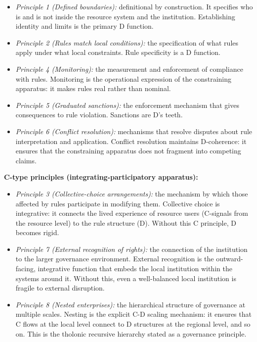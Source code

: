 \documentclass[12pt]{article}
\providecommand{\tightlist}{%
  \setlength{\itemsep}{0pt}\setlength{\parskip}{0pt}}
\begin{document}
\begin{itemize}
\tightlist
\item
  \emph{Principle 1 (Defined boundaries):} definitional by construction.
  It specifies who is and is not inside the resource system and the
  institution. Establishing identity and limits is the primary D
  function.
\item
  \emph{Principle 2 (Rules match local conditions):} the specification
  of what rules apply under what local constraints. Rule specificity is
  a D function.
\item
  \emph{Principle 4 (Monitoring):} the measurement and enforcement of
  compliance with rules. Monitoring is the operational expression of the
  constraining apparatus: it makes rules real rather than nominal.
\item
  \emph{Principle 5 (Graduated sanctions):} the enforcement mechanism
  that gives consequences to rule violation. Sanctions are D's teeth.
\item
  \emph{Principle 6 (Conflict resolution):} mechanisms that resolve
  disputes about rule interpretation and application. Conflict
  resolution maintains D-coherence: it ensures that the constraining
  apparatus does not fragment into competing claims.
\end{itemize}

\textbf{C-type principles (integrating-participatory apparatus):}

\begin{itemize}
\tightlist
\item
  \emph{Principle 3 (Collective-choice arrangements):} the mechanism by
  which those affected by rules participate in modifying them.
  Collective choice is integrative: it connects the lived experience of
  resource users (C-signals from the resource level) to the rule
  structure (D). Without this C principle, D becomes rigid.
\item
  \emph{Principle 7 (External recognition of rights):} the connection of
  the institution to the larger governance environment. External
  recognition is the outward-facing, integrative function that embeds
  the local institution within the systems around it. Without this, even
  a well-balanced local institution is fragile to external disruption.
\item
  \emph{Principle 8 (Nested enterprises):} the hierarchical structure of
  governance at multiple scales. Nesting is the explicit C-D scaling
  mechanism: it ensures that C flows at the local level connect to D
  structures at the regional level, and so on. This is the tholonic
  recursive hierarchy stated as a governance principle.
\end{itemize}
\end{document}
